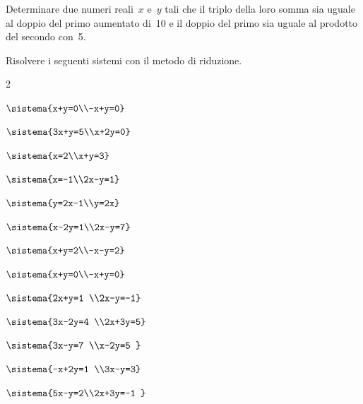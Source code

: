 \begin{esercizio}
 \label{ese:22.15}
Determinare due numeri reali~\(x\) e~\(y\) tali che il
triplo della loro somma sia uguale al doppio del primo aumentato di~10
e il doppio del primo sia uguale al prodotto del secondo con~5.
 \end{esercizio}


 \begin{esercizio}[*]
 \label{ese:22.20}
Risolvere i seguenti sistemi con il metodo di riduzione.

\begin{htmulticols}{2}
 \begin{enumeratea}
 \item \(\sistema{x+y=0\\-x+y=0}\)
\item \(\sistema{3x+y=5\\x+2y=0}\)
\item \(\sistema{x=2\\x+y=3}\)
\item \(\sistema{x=-1\\2x-y=1}\)
 \item \(\sistema{y=2x-1\\y=2x}\)
\item \(\sistema{x-2y=1\\2x-y=7}\)
\item \(\sistema{x+y=2\\-x-y=2}\)
 \item \(\sistema{x+y=0\\-x+y=0}\)
 \item \(\sistema{2x+y=1 \\2x-y=-1}\)
\item \(\sistema{3x-2y=4 \\2x+3y=5}\)
\item \(\sistema{3x-y=7 \\x-2y=5 }\)
\item \(\sistema{-x+2y=1 \\3x-y=3}\)
\item \(\sistema{5x-y=2\\2x+3y=-1 }\)

\end{enumeratea}
\end{htmulticols}
\end{esercizio}
